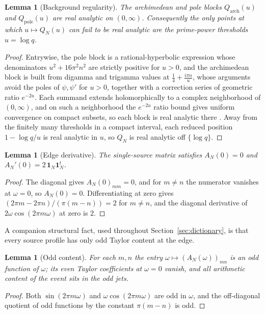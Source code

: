 \documentclass[11pt]{article}
\theoremstyle{plain}
\newtheorem{lemma}[theorem]{Lemma}
\theoremstyle{definition}
\theoremstyle{remark}
\newcommand{\one}{\mathbf 1}
\begin{document}
\begin{lemma}[Background regularity]\label{lem:background}
The archimedean and pole blocks $Q_{\mathrm{arch}}(u)$ and $Q_{\mathrm{pole}}(u)$
are real analytic on $(0,\infty)$. Consequently the only points at which
$u\mapsto Q_N(u)$ can fail to be real analytic are the prime-power thresholds
$u=\log q$.
\end{lemma}

\begin{proof}
Entrywise, the pole block is a rational-hyperbolic expression whose denominators
$u^2+16\pi^2n^2$ are strictly positive for $u>0$, and the archimedean block is
built from digamma and trigamma values at $\tfrac14+\tfrac{i\pi n}{u}$, whose
arguments avoid the poles of $\psi,\psi'$ for $u>0$, together with a correction
series of geometric ratio $e^{-2u}$. Each summand extends holomorphically to a
complex neighborhood of $(0,\infty)$, and on such a neighborhood the $e^{-2u}$
ratio bound gives uniform convergence on compact subsets, so each block is real
analytic there \cite{Groskin2026FiniteDictionary}. Away from the finitely many
thresholds in a compact interval, each reduced position $1-\log q/u$ is real
analytic in $u$, so $Q_N$ is real analytic off $\{\log q\}$.
\end{proof}

\begin{lemma}[Edge derivative]\label{lem:edge}
The single-source matrix satisfies $A_N(0)=0$ and $A_N'(0)=2\,\one_N\one_N^t$.
\end{lemma}

\begin{proof}
The diagonal gives $A_N(0)_{mm}=0$, and for $m\ne n$ the numerator vanishes at
$\omega=0$, so $A_N(0)=0$. Differentiating at zero gives
$(2\pi m-2\pi n)/(\pi(m-n))=2$ for $m\ne n$, and the diagonal derivative of
$2\omega\cos(2\pi m\omega)$ at zero is $2$.
\end{proof}

A companion structural fact, used throughout Section~\ref{sec:dictionary}, is
that every source profile has only odd Taylor content at the edge.

\begin{lemma}[Odd content]\label{lem:odd}
For each $m,n$ the entry $\omega\mapsto(A_N(\omega))_{mn}$ is an odd function of
$\omega$; its even Taylor coefficients at $\omega=0$ vanish, and all arithmetic
content of the event sits in the odd jets.
\end{lemma}

\begin{proof}
Both $\sin(2\pi m\omega)$ and $\omega\cos(2\pi m\omega)$ are odd in $\omega$, and
the off-diagonal quotient of odd functions by the constant $\pi(m-n)$ is odd.
\end{proof}
\end{document}
